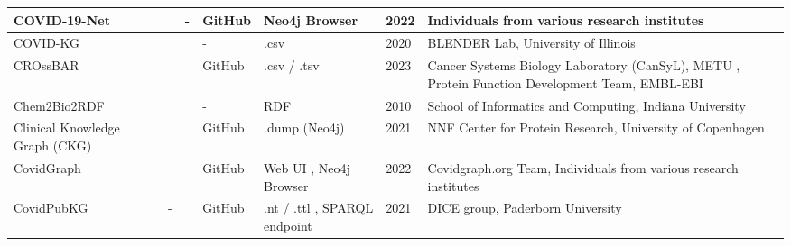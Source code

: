 \documentclass{article}
\begin{document}
\begin{landscape}
\begin{xltabular}{\textwidth}{p{3cm}|p{2.2cm}|p{2.2cm}|p{2.2cm}|p{2.2cm}|p{1cm}|p{6cm}}
\hline


COVID-19-Net
&
\cite{covid19net_website}
&
-
&
GitHub
\cite{covid19net_github}
&
Neo4j Browser
\cite{covid19net_data}
&
2022
&
Individuals from various research institutes
\\


\hline


COVID-KG
&
\cite{covidkg_website}
&
\cite{covidkg_publication}
&
-
&
.csv
\cite{covidkg_data}
&
2020
&
BLENDER Lab, University of Illinois
\cite{covidkg_group}
\\


\hline


CROssBAR
&
\cite{crossbar_website1}
\cite{crossbar_website2}
&
\cite{crossbar_publication}
&
GitHub
\cite{crossbar_github}
&
.csv / .tsv
\cite{crossbar_data}
&
2023
&
Cancer Systems Biology Laboratory (CanSyL), METU
\cite{crossbar_group1},
Protein Function Development Team, EMBL-EBI
\cite{crossbar_group2}
\\


\hline


Chem2Bio2RDF
&
\cite{chem2bio2rdf_website}
&
\cite{chem2bio2rdf_publication}
&
-
&
RDF
\cite{chem2bio2rdf_data}
&
2010
&
School of Informatics and Computing, Indiana University
\cite{chem2bio2rdf_group}
\\


\hline


Clinical Knowledge Graph (CKG)
&
\cite{ckg_website}
&
\cite{ckg_publication1}
\cite{ckg_publication2}
&
GitHub
\cite{ckg_github}
&
.dump (Neo4j)
\cite{ckg_data}
&
2021
&
NNF Center for Protein Research, University of Copenhagen
\cite{ckg_group}
\\


\hline


CovidGraph
&
\cite{covidgraph_website1}
\cite{covidgraph_website2}
\cite{covidgraph_website3}
&
\cite{covidgraph_publication}
&
GitHub
\cite{covidgraph_github}
&
Web UI
\cite{covidgraph_data1},
Neo4j Browser
\cite{covidgraph_data2}
&
2022
&
Covidgraph.org Team, Individuals from various research institutes
\cite{covidgraph_group}
\\


\hline


CovidPubKG
&
-
&
\cite{covidpubkg_publication}
&
GitHub
\cite{covidpubkg_github}
&
.nt / .ttl
\cite{covidpubkg_data1}
\cite{covidpubkg_data2},
SPARQL endpoint
\cite{covidpubkg_data3}
&
2021
&
DICE group, Paderborn University 
\cite{covidpubkg_group}
\\



\end{xltabular}
\end{landscape}
\end{document}
